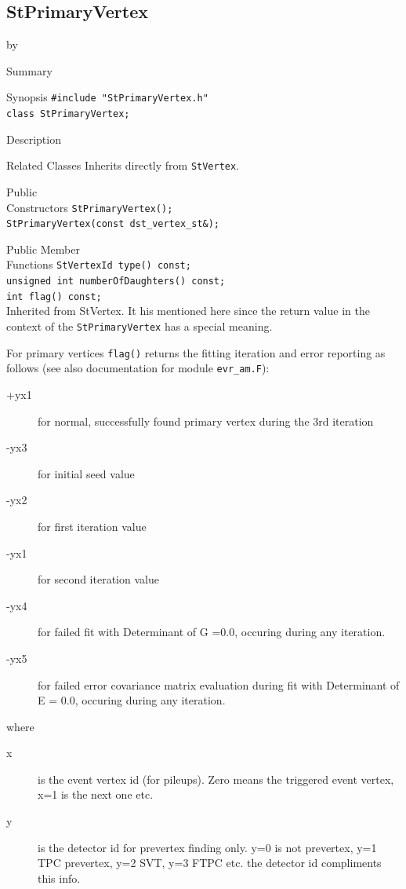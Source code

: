 \documentclass[twoside]{article}
\newcommand{\entrylabel}[1]{\mbox{\textbf{{#1}}}\hfil}%
\newenvironment{entry}
{\begin{list}{}%
    {\renewcommand{\makelabel}{\entrylabel}%
     \setlength{\labelwidth}{90pt}%
     \setlength{\leftmargin}{\labelwidth}
     \advance\leftmargin by \labelsep%
      }%
    }%
  {\end{list}}
\newcommand{\Entrylabel}[1]%
{\raisebox{0pt}[1ex][0pt]{\makebox[\labelwidth][l]%
    {\parbox[t]{\labelwidth}{\hspace{0pt}\textbf{{#1}}}}}}
\newenvironment{Entry}%
{\renewcommand{\entrylabel}{\Entrylabel}\begin{entry}}%
  {\end{entry}}
\begin{document}
\subsection{StPrimaryVertex}
\label{sec:StPrimaryVertex}
\begin{Entry}
\item[Summary]
\item[Synopsis]
    \verb+#include "StPrimaryVertex.h"+\\
    \verb+class StPrimaryVertex;+\\
\item[Description]

\item[Related Classes]
    Inherits directly from \texttt{StVertex}.
    
\item[Public\\ Constructors]
    \verb+StPrimaryVertex();+\\
    \verb+StPrimaryVertex(const dst_vertex_st&);+\\

\item[Public Member\\ Functions]
    \verb+StVertexId type() const;+\\
    \verb+unsigned int numberOfDaughters() const;+\\
    

    \verb+int flag() const;+\\
    Inherited from StVertex. It his mentioned here since the return
    value in the context of the \texttt{StPrimaryVertex} has a special
    meaning.
    
    For primary vertices \texttt{flag()} returns the fitting iteration
    and error reporting as follows (see also documentation for module
    \texttt{evr\_am.F}):
    \begin{description}             
    \item[+yx1] for normal, successfully found primary vertex during
        the 3rd iteration
    \item[-yx3] for initial seed value
    \item[-yx2] for first iteration value
    \item[-yx1] for second iteration value
    \item[-yx4] for failed fit with Determinant of G =0.0, occuring
        during any iteration.
    \item[-yx5] for failed error covariance matrix evaluation during
        fit with Determinant of E = 0.0, occuring during any
        iteration.
    \end{description}
    where
    \begin{description}             
    \item[x] is the event vertex id (for pileups). Zero means the
        triggered event vertex, x=1 is the next one etc.
    \item[y] is the detector id for prevertex finding only.  y=0 is not
        prevertex, y=1 TPC prevertex, y=2 SVT, y=3 FTPC etc. the detector id
        compliments this info.
    \end{description}


\end{Entry}
\end{document}
